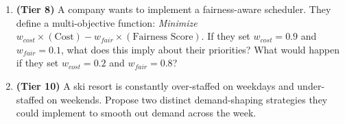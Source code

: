 \documentclass{article}
\begin{document}
\begin{enumerate}[label=\textbf{Q\arabic*:}, wide, labelsep=5pt]
    \item \textbf{(Tier 8)} A company wants to implement a fairness-aware scheduler. They define a multi-objective function: \textit{Minimize $w_{cost} \times (\text{Cost}) - w_{fair} \times (\text{Fairness Score})$}. If they set $w_{cost}=0.9$ and $w_{fair}=0.1$, what does this imply about their priorities? What would happen if they set $w_{cost}=0.2$ and $w_{fair}=0.8$?

    \item \textbf{(Tier 10)} A ski resort is constantly over-staffed on weekdays and under-staffed on weekends. Propose two distinct demand-shaping strategies they could implement to smooth out demand across the week.

\end{enumerate}
\end{document}

